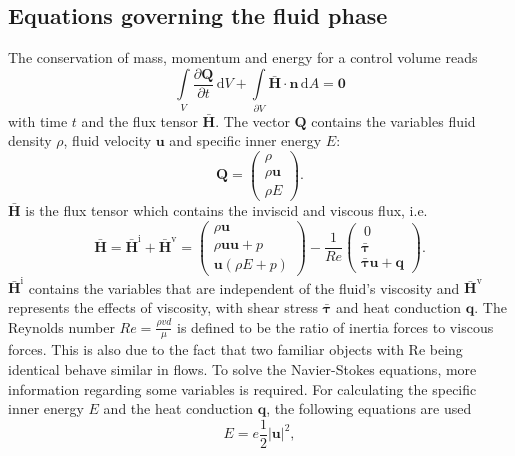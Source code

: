 \documentclass[11pt,a4paper,openany,oneside,parskip=half*]{article}
\renewcommand*\vec[1]{\boldsymbol{#1}}
\renewcommand*\matrix[1]{\boldsymbol{#1}}
\begin{document}
\subsection{Equations governing the fluid phase}
The conservation of mass, momentum and energy for a control volume reads
\begin{equation}
  \int\limits_V \frac{\partial{\vec{Q}}}{\partial{t}} \, \mathrm{d} V+ \int\limits_{\partial{V}} \vec{\bar{H}} \cdot \vec{n} \, \mathrm{d} A = \vec0
\end{equation}
with time $t$ and the flux tensor $ \vec{\bar{H}} $.
The vector $ \vec{Q} $ contains the variables fluid density $ \rho $, 
fluid velocity $ \vec{u} $ and specific inner energy $ E $: 
\begin{equation}
 \vec{Q}= \left( \begin{array}{c}\rho\\\rho \vec{u}\\\rho E \end{array} \right).
\end{equation}
$\vec{\bar{H}} $ is the flux tensor which contains the inviscid and viscous flux, i.e.
\begin{equation} \label{NavierStokes}
\vec{\bar{H}} = \vec{\bar{H}^\mathrm{i}} + \vec{\bar{H}^\mathrm{v}} = 
 \left( \begin{array}{c}\rho \vec{u}\\\rho \vec{u} \vec{u} + p\\\vec{u} (\rho E + p) \end{array} \right) - 
 \frac{1}{Re} \left( \begin{array}{c}\ 0 \\ \matrix{\bar{\tau}}\\ \matrix{\bar{\tau}} \vec{u} + \vec{q} \end{array} \right).
\end{equation} 
$ \vec{\bar{H}^\mathrm{i}} $ contains the variables that are independent of the fluid's viscosity and $ \vec{\bar{H}^\mathrm{v}} $ represents the effects of viscosity, with shear stress $\matrix{\bar{\tau}}$ and heat conduction $\vec{q}$. The Reynolds number 
$ Re = \frac{\rho v d}{\mu} $ is defined to be the ratio of inertia forces to viscous forces. This is also due to the 
fact that two familiar objects with Re being identical behave similar in flows.
To solve the Navier-Stokes equations, more information regarding some variables is required. For calculating the specific inner energy $ E $ 
and the heat conduction $ \vec{q} $, the following equations are used
\begin{equation}
 E = e  \frac{1}{2} \vec{|u|}^2,
\end{equation}
\end{document}
